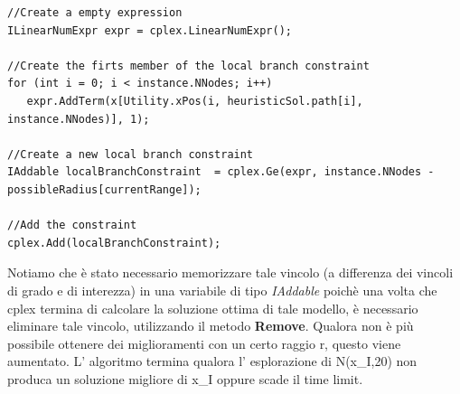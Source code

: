 \documentclass[11pt]{article}
\begin{document}
\begin{lstlisting}
//Create a empty expression
ILinearNumExpr expr = cplex.LinearNumExpr();

//Create the firts member of the local branch constraint
for (int i = 0; i < instance.NNodes; i++)
   expr.AddTerm(x[Utility.xPos(i, heuristicSol.path[i], instance.NNodes)], 1);
   
//Create a new local branch constraint
IAddable localBranchConstraint  = cplex.Ge(expr, instance.NNodes - possibleRadius[currentRange]);

//Add the constraint 
cplex.Add(localBranchConstraint);               
\end{lstlisting}    

Notiamo che è stato necessario memorizzare tale vincolo (a differenza dei vincoli di grado e di interezza) in una variabile di tipo \emph{IAddable} poichè una volta che cplex termina di calcolare la soluzione ottima di tale modello, è necessario eliminare tale vincolo, utilizzando il metodo \textbf{Remove}. Qualora non è più possibile ottenere dei miglioramenti con un certo raggio r, questo viene aumentato. L' algoritmo termina qualora l' esplorazione di N(x_I,20) non produca un soluzione migliore di x_I oppure scade il time limit.
\end{document}
